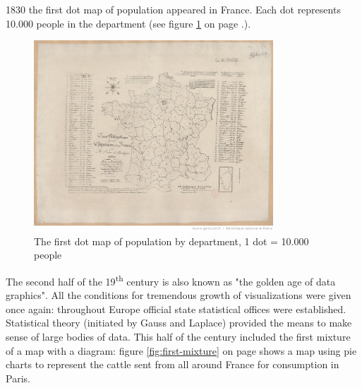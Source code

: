 1830 the first dot map of population appeared in France. Each dot represents 10.000 people in the department (see figure \ref{fig:first-dotmap} on page \pageref{fig:first-dotmap}.).

\begin{figure}[!htb]
\centering
\includegraphics[width=0.8\textwidth,keepaspectratio]{images/history/montizon-dotmap2.jpeg}
\caption[
    The first dot map of population by department, 1 dot = 10.000 people, Urldate: 07.2016 \newline
\small\texttt{\url{http://gallica.bnf.fr/ark:/12148/btv1b8492261j/f1.highres}}
]{The first dot map of population by department, 1 dot = 10.000 people}
\label{fig:first-dotmap}
\end{figure}

The second half of the 19\textsuperscript{th} century is also known as "the golden age of data graphics". All the conditions for tremendous growth of visualizations were given once again: throughout Europe official state statistical offices were established.
Statistical theory (initiated by Gauss and Laplace) provided the means to make sense of large bodies of data.
This half of the century included the first mixture of a map with a diagram: figure \ref{fig:first-mixture} on page \pageref{fig:first-mixture} shows a map using pie charts to represent the cattle sent from all around France for consumption in Paris.


